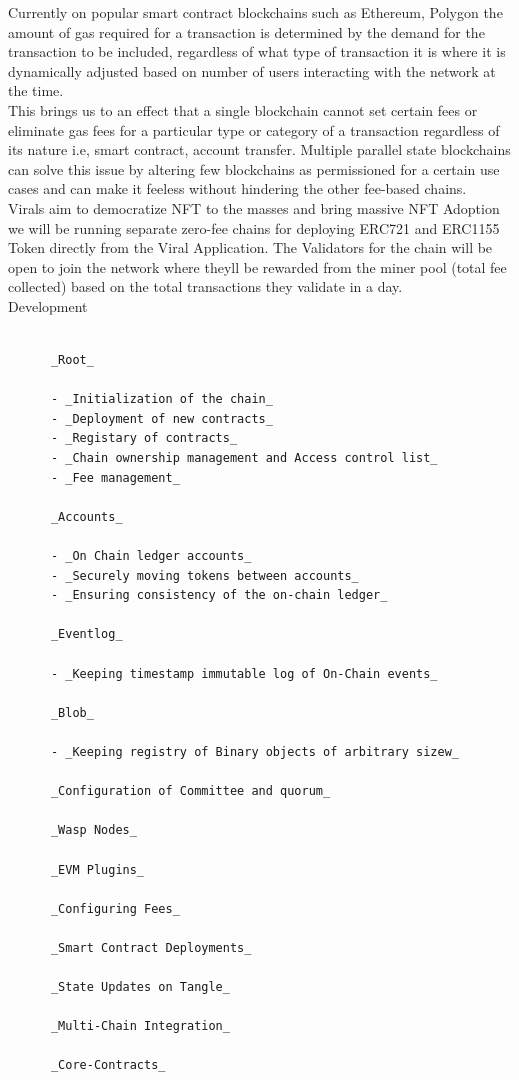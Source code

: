 \documentclass[10pt]{article}
\begin{document}
Currently on popular smart contract blockchains such as Ethereum, Polygon the amount of gas required for a transaction is determined by the demand for the transaction to be included, regardless of what type of transaction it is where it is dynamically adjusted based on number of user\textsc{}s interacting with the network at the time.\\

This brings us to an effect that a single blockchain cannot set certain fees or eliminate gas fees for a particular type or category of a transaction regardless of it\textsc{}s nature i.e, smart contract, account transfer. Multiple parallel state blockchains can solve this issue by altering few blockchains as permissioned for a certain use cases and can make it feeless without hindering the other fee-based chains.\\

Viral\textsc{}s aim to democratize NFT to the masses and bring massive NFT Adoption we will be running separate zero-fee chains for deploying ERC721 and ERC1155 Token directly from the Viral Application. The Validators for the chain will be open to join the network where they\textsc{}ll be rewarded from the miner pool (total fee collected) based on the total transactions they validate in a day.\\


Development

\begin{lstlisting}

      _Root_

      - _Initialization of the chain_
      - _Deployment of new contracts_
      - _Registary of contracts_
      - _Chain ownership management and Access control list_
      - _Fee management_

      _Accounts_

      - _On Chain ledger accounts_
      - _Securely moving tokens between accounts_
      - _Ensuring consistency of the on-chain ledger_

      _Eventlog_

      - _Keeping timestamp immutable log of On-Chain events_

      _Blob_

      - _Keeping registry of Binary objects of arbitrary sizew_

      _Configuration of Committee and quorum_

      _Wasp Nodes_

      _EVM Plugins_

      _Configuring Fees_

      _Smart Contract Deployments_

      _State Updates on Tangle_

      _Multi-Chain Integration_

      _Core-Contracts_

\end{lstlisting}
\end{document}
